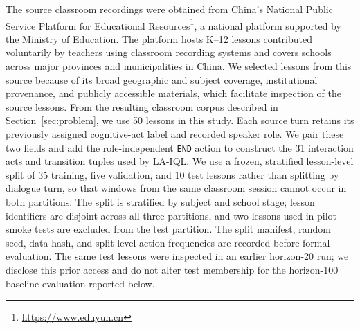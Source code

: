 \documentclass[manuscript,review,anonymous]{acmart}
\begin{document}
The source classroom recordings were obtained from China's National Public
Service Platform for Educational Resources\footnote{\url{https://www.eduyun.cn}},
a national platform supported by the Ministry of Education. The platform hosts
K--12 lessons contributed voluntarily by teachers using classroom recording
systems and covers schools across major provinces and municipalities in China.
We selected lessons from this source because of its broad geographic and
subject coverage, institutional provenance, and publicly accessible materials,
which facilitate inspection of the source lessons. From the resulting classroom
corpus described in Section~\ref{sec:problem}, we use 50 lessons in this study.
Each source turn retains its previously assigned cognitive-act label and
recorded speaker role. We pair these two fields and add the role-independent
\texttt{END} action to construct the 31 interaction acts and transition tuples
used by LA-IQL.
We use a frozen, stratified lesson-level split of 35 training, five validation,
and 10 test lessons rather than splitting by dialogue turn, so
that windows from the same classroom session cannot occur in both partitions.
The split is stratified by subject and school stage; lesson identifiers are
disjoint across all three partitions, and two lessons used in pilot
smoke tests are excluded from the test partition.  The split manifest, random
seed, data hash, and split-level action frequencies are recorded before formal
evaluation.  The same test lessons were inspected in an earlier
horizon-20 run; we disclose this prior access and do not alter test membership
for the horizon-100 baseline evaluation reported below.
\end{document}

